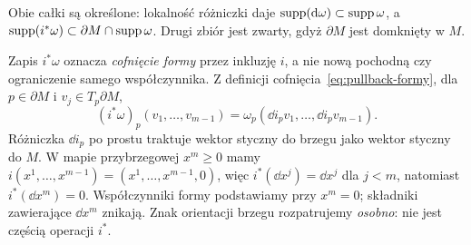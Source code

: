 Obie całki są określone: lokalność różniczki daje
$\operatorname{supp}(\mathrm d\omega)\subset\operatorname{supp}\omega$, a
$\operatorname{supp}(i^*\omega)\subset\partial M\cap\operatorname{supp}\omega$.
Drugi zbiór jest zwarty, gdyż $\partial M$ jest domknięty w $M$.

Zapis $i^*\omega$ oznacza \emph{cofnięcie formy}
przez inkluzję $i$, a nie nową pochodną czy
ograniczenie samego współczynnika. Z definicji
cofnięcia~\eqref{eq:pullback-formy}, dla
$p\in\partial M$ i $v_j\in T_p\partial M$,
\begin{equation}\label{eq:inkluzja-formy}
 (i^*\omega)_p(v_1,\ldots,v_{m-1})
 =\omega_p(\dd i_pv_1,\ldots,\dd i_pv_{m-1}).
\end{equation}
Różniczka $\dd i_p$ po prostu traktuje wektor
styczny do brzegu jako wektor styczny do $M$.
W mapie przybrzegowej $x^m\geq0$ mamy
$i(x^1,\ldots,x^{m-1})=(x^1,\ldots,x^{m-1},0)$,
więc $i^*(\dd x^j)=\dd x^j$ dla $j<m$, natomiast
$i^*(\dd x^m)=0$. Współczynniki formy podstawiamy
przy $x^m=0$; składniki zawierające $\dd x^m$
znikają. Znak orientacji brzegu rozpatrujemy
\emph{osobno}: nie jest częścią operacji $i^*$.

